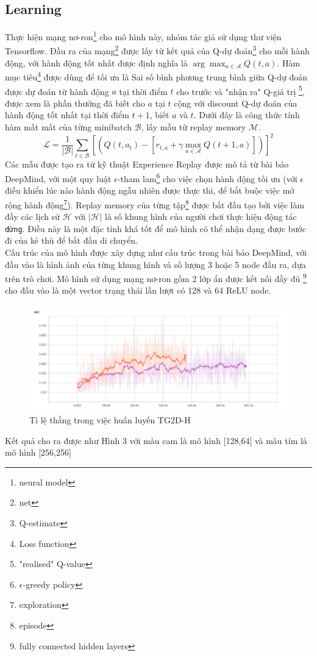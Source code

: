 \documentclass[12pt,a4paper]{article}
\begin{document}
\subsection{Learning}
Thực hiện mạng nơ-ron\footnote{neural model} cho mô hình này, nhóm tác giả sử dụng thư viện Tensorflow. Đầu ra của mạng\footnote{net} được lấy từ kết quả của Q-dự đoán\footnote{Q-estimate} cho mỗi hành động, với hành động tốt nhất được định nghĩa là $\arg \max_{a \in \mathcal{A}} Q(t,a)$. Hàm mục tiêu\footnote{Loss function} được dùng để tối ưu là Sai số bình phương trung bình\cite{mse} giữa Q-dự đoán được dự đoán từ  hành động $a$ tại thời điểm $t$ cho trước và "nhận ra" Q-giá trị \footnote{"realised" Q-value}, được xem là phần thưởng đã biết cho $a$ tại $t$ cộng với discount Q-dự đoán của hành động tốt nhất tại thời điểm $t+1$, biết $a$ và $t$. Dưới đây là công thức tính hàm mất mất của từng minibatch $\mathcal{B}$, lấy mẫu từ replay memory $\mathcal{M}$.\\
\[\mathcal{L} = \dfrac{1}{|\mathcal{B}|}\sum_{t\in \mathcal{B}}\left[\left(Q(t,a_t) - \left[r_{t,a} + \gamma \max_{a\in \mathcal{A}} Q(t+1,a)\right]\right)\right]^2\]
Các mẫu được tạo ra từ kỹ thuật Experience Replay được mô tả từ bài báo DeepMind, với một quy luật $\epsilon$-tham lam\footnote{$\epsilon$-greedy policy} cho việc chọn hành động tối ưu (với $\epsilon$ điều khiển lúc nào hành động ngẫu nhiên được thực thi, để bắt buộc việc mở rộng hành động\footnote{exploration}). Replay memory của từng tập\footnote{episode} được bắt đầu tạo bởi việc làm đầy các lịch sử $\mathcal{H}$ với $|\mathcal{H}|$ là số khung hình của người chơi thực hiện động tác \texttt{dừng}. Điều này là một đặc tính khá tốt để mô hình có thể nhận dạng được bước đi của kẻ thù để bắt đầu di chuyển.\\
Cấu trúc của mô hình được xây dựng như cấu trúc trong bài báo DeepMind\cite{deepmindpaper}, với đầu vào là hình ảnh của từng khung hình và số lượng 3 hoặc 5 node đầu ra, dựa trên trò chơi. Mô hình sử dụng mạng nơ-ron gồm 2 lớp ẩn được kết nối đầy đủ \footnote{fully connected hidden layers} cho đầu vào là một vector trạng thái lần lượt có 128 và 64 ReLU node.\\
\begin{figure}[t]
    \centering
    \includegraphics{photo/2model.png}
    \caption{Tỉ lệ thắng trong việc huấn luyến TG2D-H}
    \label{fig:my_label}
\end{figure}
Kết quả cho ra được như Hình 3 với màu cam là mô hình [128,64] và màu tím là mô hình [256,256]\\
\end{document}
